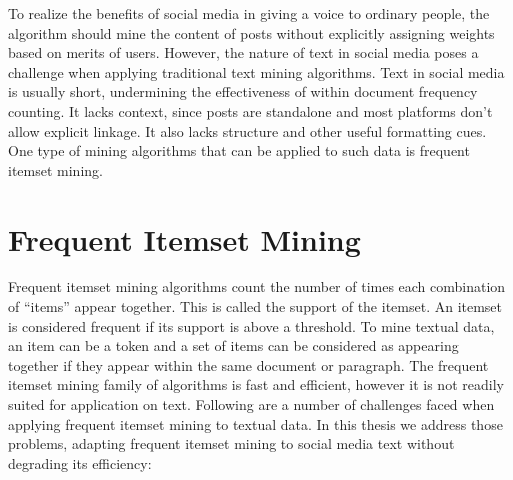 \documentclass[letterpaper,12pt,titlepage,oneside,final]{book}
\begin{document}
To realize the benefits of social media in giving a voice to ordinary people,
the algorithm should mine the content of posts 
without explicitly assigning weights based on merits of users. %
However, the nature of text in social media poses a challenge when applying
traditional text mining algorithms. 
Text in social media is usually short, undermining the effectiveness of within document frequency counting.
It lacks context, since posts are standalone and most platforms don't allow explicit linkage.
It also lacks structure and other useful formatting cues. 
One type of mining algorithms that can be applied to such data is frequent itemset mining.

\section{Frequent Itemset Mining}

Frequent itemset mining algorithms count the number of times each
combination of ``items'' appear together. 
This is called the support of the itemset.
An itemset is considered frequent if its support is above a threshold.
To mine textual data, an item can be a token and a set of items can
be considered as appearing together if they appear within the same document
or paragraph. The frequent itemset mining family of algorithms is fast and efficient,
however it is not readily suited for application on text. 
Following are a number of challenges faced when applying 
frequent itemset mining to textual data. In this thesis we address those problems, adapting frequent itemset mining to
social media text without degrading its efficiency:
\end{document}
